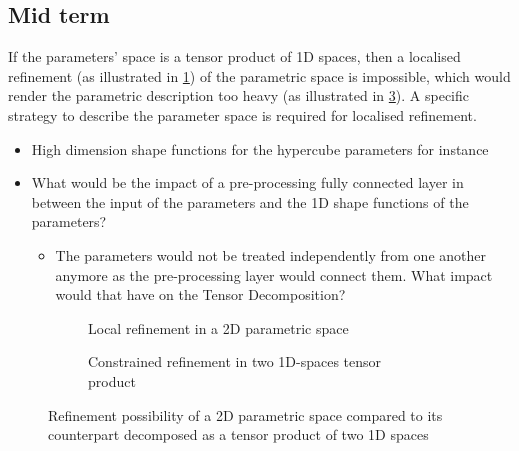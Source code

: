 \subsection{Mid term}
\label{ParaRefinement}
If the parameters' space is a tensor product of 1D spaces, then a localised refinement (as illustrated in \cref{fig:LocalRefinement}) of the parametric space is impossible, which would render the parametric description too heavy (as illustrated in \cref{fig:TDRefinement}). A specific strategy to describe the parameter space is required for localised refinement. 
\begin{itemize}
    \item High dimension shape functions for the hypercube parameters for instance
    \item What would be the impact of a pre-processing fully connected layer in between the input of the parameters and the 1D shape functions of the parameters?
    \begin{itemize}
        \item The parameters would not be treated independently from one another anymore as the pre-processing layer would connect them. What impact would that have on the Tensor Decomposition?
    \end{itemize}
\end{itemize}

\begin{figure}
\begin{subfigure}[t]{0.5\linewidth}
    \centering
    
    \caption{Local refinement in a 2D parametric space}
    \label{fig:LocalRefinement}
\end{subfigure}
  \begin{subfigure}[t]{0.5\linewidth}
    \centering
    
    \caption{Constrained refinement in two 1D-spaces tensor product}
    \label{fig:TDRefinement}
\end{subfigure}  
\caption{Refinement possibility of a 2D parametric space compared to its counterpart decomposed as a tensor product of two 1D spaces}
\end{figure}

